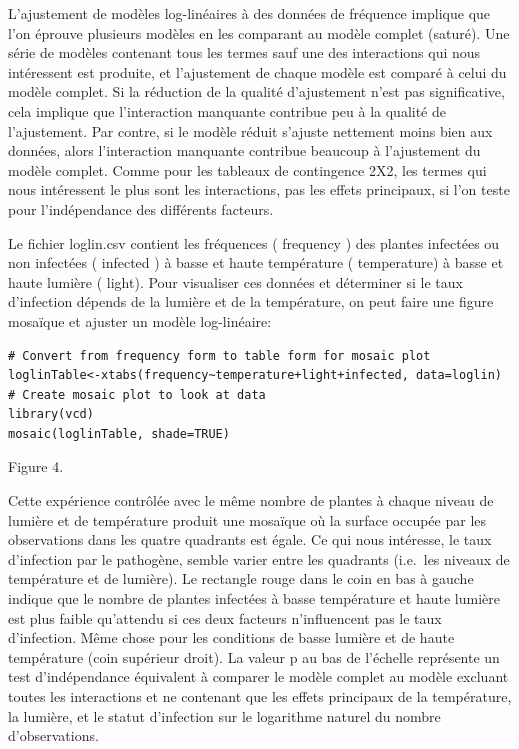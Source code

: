 \documentclass[12pt,]{book}
\begin{document}
L'ajustement de modèles log-linéaires à des données de fréquence
implique que l'on éprouve plusieurs modèles en les comparant au
modèle complet (saturé). Une série de modèles contenant tous les
termes sauf une des interactions qui nous intéressent est produite, et
l'ajustement de chaque modèle est comparé à celui du modèle
complet. Si la réduction de la qualité d'ajustement n'est pas
significative, cela implique que l'interaction manquante contribue peu
à la qualité de l'ajustement. Par contre, si le modèle réduit s'ajuste
nettement moins bien aux données, alors l'interaction manquante
contribue beaucoup à l'ajustement du modèle complet. Comme pour
les tableaux de contingence 2X2, les termes qui nous intéressent le
plus sont les interactions, pas les effets principaux, si l'on teste pour
l'indépendance des différents facteurs.

Le fichier loglin.csv contient les fréquences ( frequency ) des
plantes infectées ou non infectées ( infected ) à basse et haute
température ( temperature) à basse et haute lumière ( light). Pour
visualiser ces données et déterminer si le taux d'infection dépends de
la lumière et de la température, on peut faire une figure mosaïque et
ajuster un modèle log-linéaire:

\begin{verbatim}
# Convert from frequency form to table form for mosaic plot
loglinTable<-xtabs(frequency~temperature+light+infected, data=loglin)
# Create mosaic plot to look at data
library(vcd)
mosaic(loglinTable, shade=TRUE)
\end{verbatim}

Figure 4.

Cette expérience contrôlée avec le même nombre de plantes à chaque
niveau de lumière et de température produit une mosaïque où la
surface occupée par les observations dans les quatre quadrants est
égale. Ce qui nous intéresse, le taux d'infection par le pathogène,
semble varier entre les quadrants (i.e.~les niveaux de température et de
lumière). Le rectangle rouge dans le coin en bas à gauche indique que
le nombre de plantes infectées à basse température et haute lumière
est plus faible qu'attendu si ces deux facteurs n'influencent pas le taux
d'infection. Même chose pour les conditions de basse lumière et de
haute température (coin supérieur droit). La valeur p au bas de
l'échelle représente un test d'indépendance équivalent à comparer le
modèle complet au modèle excluant toutes les interactions et ne
contenant que les effets principaux de la température, la lumière, et le
statut d'infection sur le logarithme naturel du nombre d'observations.
\end{document}
